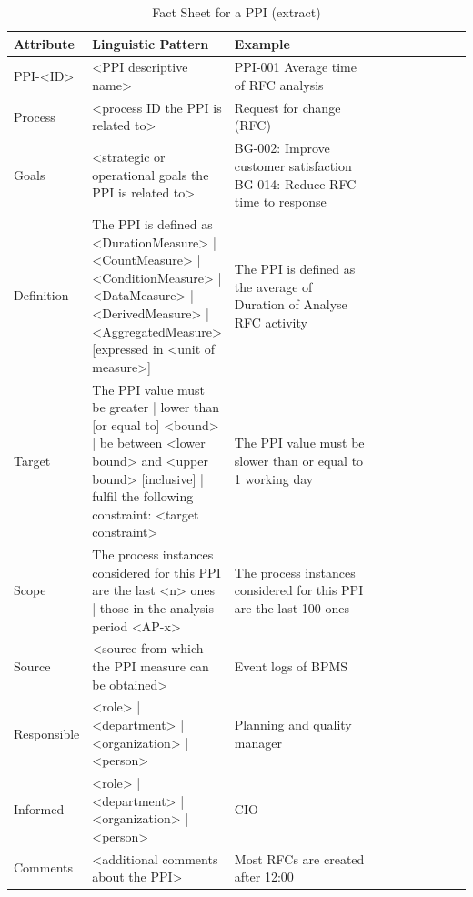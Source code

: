 \begin{table}[htbp]
	\footnotesize
	\centering
	\begin{tabular}[t]{@{}l p{0.3\linewidth} p{0.4\linewidth} p{0.5\linewidth} @{}}
		\toprule
		\textbf{Attribute} & \textbf{Linguistic Pattern}  & \textbf{Example}\\
		\midrule
		PPI-<ID> & <PPI descriptive name> & PPI-001 Average time of RFC analysis
		\\
		Process	& <process ID the PPI is related to> & Request for change (RFC)
		\\
		Goals & <strategic or operational goals the PPI is related to> & BG-002: Improve customer satisfaction \newline
		BG-014: Reduce RFC time to response
		\\
		Definition & The PPI is defined as { \newline
			<DurationMeasure> | <CountMeasure> | <ConditionMeasure> |
			<DataMeasure> | <DerivedMeasure> | <AggregatedMeasure> }
		[expressed in <unit of measure>] & The PPI is defined as the average of Duration of Analyse RFC activity
		\\
		Target & The PPI value must { \newline
			be {greater | lower} than [or equal to] <bound> | \newline
			be between <lower bound> and <upper bound> [inclusive] |\newline
			fulfil the following constraint: <target constraint> } & The PPI value must be slower than or equal to 1 working day
		\\
		Scope & The process instances considered for this PPI are {
			the last <n> ones |
			those in the analysis period <AP-x> } & The process instances considered for this PPI are the last 100 ones
		\\
		Source & <source from which the PPI measure can be obtained> &	Event logs of BPMS
		\\
		Responsible & { <role> | <department> | <organization> | <person> } &	Planning and quality manager
		\\
		Informed &{ <role> | <department> | <organization> | <person> } & CIO
		\\
		Comments & <additional comments about the PPI> & Most RFCs are created after 12:00
		\\
\bottomrule
\end{tabular}
\caption{Fact Sheet for a PPI (extract)}
\label{tbl:Fact-Sheet}
\end{table}


